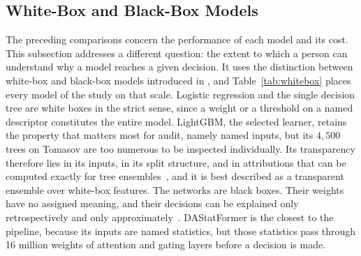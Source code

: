 \subsection{White-Box and Black-Box Models}
\label{sec:resWhiteBox}
The preceding comparisons concern the performance of each model and its cost. This subsection addresses a different question: the extent to which a person can understand why a model reaches a given decision. It uses the distinction between white-box and black-box models introduced in , and Table~\ref{tab:whitebox} places every model of the study on that scale. Logistic regression and the single decision tree are white boxes in the strict sense, since a weight or a threshold on a named descriptor constitutes the entire model. LightGBM, the selected learner, retains the property that matters most for audit, namely named inputs, but its $4{,}500$ trees on Tomasov are too numerous to be inspected individually. Its transparency therefore lies in its inputs, in its split structure, and in attributions that can be computed exactly for tree ensembles~\cite{lundberg2020trees}, and it is best described as a transparent ensemble over white-box features. The networks are black boxes. Their weights have no assigned meaning, and their decisions can be explained only retrospectively and only approximately~\cite{guidotti2018survey}. DAStatFormer is the closest to the pipeline, because its inputs are named statistics, but those statistics pass through 16 million weights of attention and gating layers before a decision is made.

